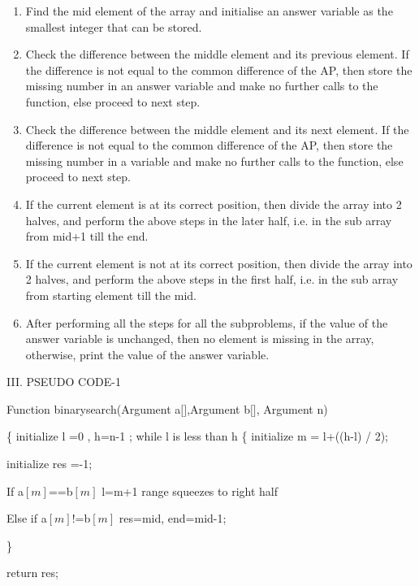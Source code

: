 \documentclass[12pt,a4paper]{article}
\begin{document}
\begin{multicols}{2}
\begin{enumerate}
\item Find the mid element of the array and initialise an answer variable as the smallest integer that can be stored.
\item Check the difference between the middle element and its previous element. If the difference is not equal to the common difference of the AP, then store the missing number in an answer variable and make no further calls to the function, else proceed to next step.
\item Check the difference between the middle element and its next element. If the difference is not equal to the common difference of the AP, then store the missing number in a variable and make no further calls to the function, else proceed to next step.
\item If the current element is at its correct position, then divide the array into 2 halves, and perform the above steps in the later half, i.e. in the sub array from mid+1 till the end.
\item If the current element is not at its correct position, then divide the array into 2 halves, and perform the above steps in the first half, i.e. in the sub array from starting element till the mid.
\item After performing all the steps for all the subproblems, if the value of the answer variable is unchanged, then no element is missing in the array, otherwise, print the value of the answer variable.
\setcounter{numberedCntB}{\theenumi}
\end{enumerate}





\begin{center}III. PSEUDO CODE-1\end{center}


Function binarysearch(Argument a$[$$]$,Argument b$[$$]$, Argument n) 


\{ 
\quad initialize l =0 , h=n-1 ;
\quad  while l is less than h 
\{
\quad initialize m = l+((h-l) / 2);

\quad initialize res =-1;



\quad If a$[m]$==b$[m]$ l=m+1 range squeezes to right half


\quad Else if a$[m]$!=b$[m]$  res=mid, end=mid-1;


\}
 

\quad return res; 


\end{multicols}
\end{document}
